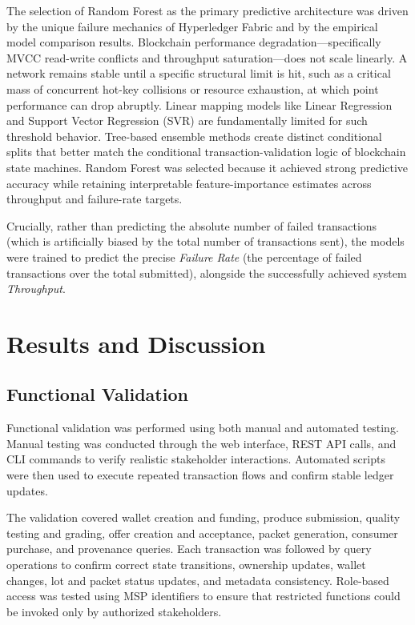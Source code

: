 \documentclass[manuscript,screen,nofonts]{acmart}
\begin{document}
The selection of Random Forest as the primary predictive architecture was driven by the unique failure mechanics of Hyperledger Fabric and by the empirical model comparison results. Blockchain performance degradation---specifically MVCC read-write conflicts and throughput saturation---does not scale linearly. A network remains stable until a specific structural limit is hit, such as a critical mass of concurrent hot-key collisions or resource exhaustion, at which point performance can drop abruptly. Linear mapping models like Linear Regression and Support Vector Regression (SVR) are fundamentally limited for such threshold behavior. Tree-based ensemble methods create distinct conditional splits that better match the conditional transaction-validation logic of blockchain state machines. Random Forest was selected because it achieved strong predictive accuracy while retaining interpretable feature-importance estimates across throughput and failure-rate targets.

Crucially, rather than predicting the absolute number of failed transactions (which is artificially biased by the total number of transactions sent), the models were trained to predict the precise \textit{Failure Rate} (the percentage of failed transactions over the total submitted), alongside the successfully achieved system \textit{Throughput}.

\section{Results and Discussion}
\subsection{Functional Validation}

Functional validation was performed using both manual and automated testing. Manual testing was conducted through the web interface, REST API calls, and CLI commands to verify realistic stakeholder interactions. Automated scripts were then used to execute repeated transaction flows and confirm stable ledger updates.

The validation covered wallet creation and funding, produce submission, quality testing and grading, offer creation and acceptance, packet generation, consumer purchase, and provenance queries. Each transaction was followed by query operations to confirm correct state transitions, ownership updates, wallet changes, lot and packet status updates, and metadata consistency. Role-based access was tested using MSP identifiers to ensure that restricted functions could be invoked only by authorized stakeholders.
\end{document}
